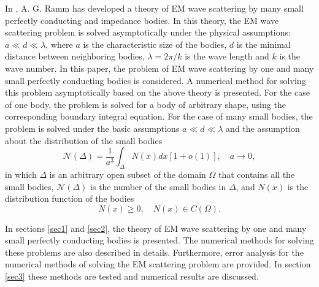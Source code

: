 \documentclass[12pt]{article}
\numberwithin{equation}{section}
\newcommand{\be}{\begin{equation}}
\newcommand{\ee}{\end{equation}}
\begin{document}
In \cite{R620,R635,R652,andriychuk2012electromagnetic,ramm2014application,ramm2014calculation}, A. G. Ramm has developed a theory of EM wave scattering by many small perfectly conducting and impedance bodies. In this theory, the EM wave scattering problem is solved asymptotically under the physical assumptions: $a\ll d \ll \lambda$, where $a$ is the characteristic size of the bodies, $d$ is the minimal distance between neighboring bodies, $\lambda=2\pi/k$ is the wave length and $k$ is the wave number. In this paper, the problem of EM wave scattering by one and many small perfectly conducting bodies is considered. A numerical method for solving this problem asymptotically based on the above theory is presented. For the case of one body, the problem is solved for a body of arbitrary shape, using the corresponding boundary integral equation. For the case of many small bodies, the problem is solved under the basic assumptions $a\ll d \ll \lambda$ and the assumption about the distribution of the small bodies
\be
    \mathcal{N}(\Delta)=\frac{1}{a^3} \int_\Delta N(x)dx[1+o(1)], \quad a\to 0,
\ee
in which $\Delta$ is an arbitrary open subset of the domain $\Omega$ that contains all the small bodies, $\mathcal{N}(\Delta)$ is the number of the small bodies in $\Delta$,  and $N(x)$ is the distribution function of the bodies
\be
    N(x)\ge 0, \quad N(x) \in C(\Omega).
\ee

In sections \ref{sec1} and \ref{sec2}, the theory of EM wave scattering by one and many small perfectly conducting bodies is presented. The numerical methods for solving these problems are also  described in details. Furthermore, error analysis for the numerical methods of solving the EM scattering problem are provided. In section \ref{sec3} these methods are tested and numerical results are discussed. 
\end{document}
